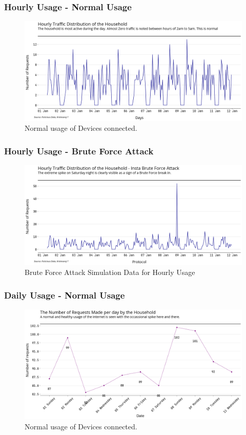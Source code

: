 \documentclass[11pt]{article}
\begin{document}
\subsubsection{Hourly Usage - Normal Usage}
\begin{figure}[H]
    \centering
    \includegraphics[width=.95\textwidth]{router_log_analysis_graphs/normal_hourly_usage.png}
    \caption{Normal usage of Devices connected. }
\end{figure}

\subsubsection{Hourly Usage - Brute Force Attack}
\begin{figure}[H]
    \centering
    \includegraphics[width=.95\textwidth]{router_log_analysis_graphs/insta_hourly_usage.png}
    \caption{Brute Force Attack Simulation Data for Hourly Usage}
\end{figure}

\subsubsection{Daily Usage - Normal Usage}
\begin{figure}[H]
    \centering
    \includegraphics[width=.95\textwidth]{router_log_analysis_graphs/normal_requests_per_day.png}
    \caption{Normal usage of Devices connected. }
\end{figure}
\end{document}
